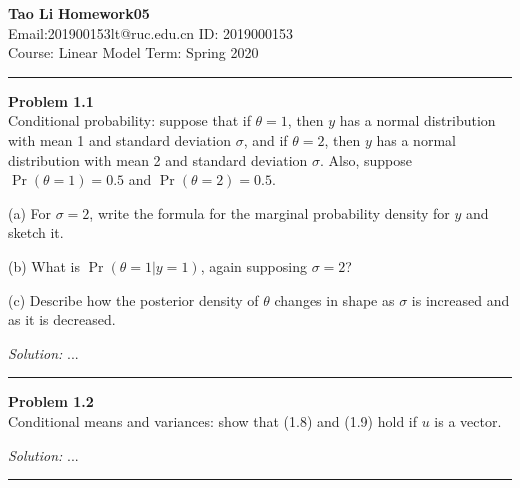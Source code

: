 \documentclass[a4paper, 11pt]{article}
\newenvironment{problem}[2][Problem]
    { \begin{mdframed}[backgroundcolor=gray!20] \textbf{#1 #2} \\}
    {  \end{mdframed}}
\newenvironment{solution}
    {\textit{Solution:}}
    {}
\begin{document}
\noindent

\large\textbf{Tao Li} \hfill \textbf{Homework05}   \\
Email:201900153lt@ruc.edu.cn  \hfill ID: 2019000153\\
\normalsize Course: Linear Model   \hfill Term: Spring 2020\\
\noindent\rule{7in}{2.8pt}

\begin{problem}{1.1}
Conditional probability: suppose that if $\theta = 1$, then $y$ has a normal distribution with mean 1 and standard deviation $\sigma$, 
and if $\theta = 2$, then $y$ has a normal distribution with mean 2 and standard deviation $\sigma$. 
Also, suppose $\operatorname{Pr}(\theta = 1) = 0.5$ and $\operatorname{Pr}(\theta = 2) = 0.5$.

(a) For $\sigma = 2$, write the formula for the marginal probability density for $y$ and sketch it. 

(b) What is $\operatorname{Pr}(\theta = 1|y = 1)$, again supposing $\sigma = 2$?

(c) Describe how the posterior density of $\theta$ changes in shape as $\sigma$ is increased and as it is decreased.
\end{problem}
\begin{solution}
...
\end{solution}

\noindent\rule{7in}{2.8pt}


\begin{problem}{1.2}
Conditional means and variances: show that (1.8) and (1.9) hold if $u$ is a vector.
\end{problem}
\begin{solution}
...
\end{solution}

\noindent\rule{7in}{2.8pt}
\end{document}
